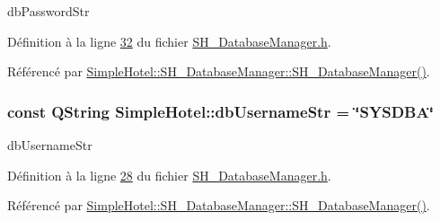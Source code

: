 db\-Password\-Str 



Définition à la ligne \hyperlink{SH__DatabaseManager_8h_source_l00032}{32} du fichier \hyperlink{SH__DatabaseManager_8h_source}{S\-H\-\_\-\-Database\-Manager.\-h}.



Référencé par \hyperlink{classSimpleHotel_1_1SH__DatabaseManager_ade00a085fdf7207d67476179e179d03d}{Simple\-Hotel\-::\-S\-H\-\_\-\-Database\-Manager\-::\-S\-H\-\_\-\-Database\-Manager()}.

\hypertarget{namespaceSimpleHotel_a4f58c043ac3cee459febaf503463b523}{
\subsubsection[{db\-Username\-Str}]{\setlength{\rightskip}{0pt plus 5cm}const Q\-String Simple\-Hotel\-::db\-Username\-Str = \char`\"{}S\-Y\-S\-D\-B\-A\char`\"{}\hspace{0.3cm}{\ttfamily [static]}}}\label{namespaceSimpleHotel_a4f58c043ac3cee459febaf503463b523}


db\-Username\-Str 



Définition à la ligne \hyperlink{SH__DatabaseManager_8h_source_l00028}{28} du fichier \hyperlink{SH__DatabaseManager_8h_source}{S\-H\-\_\-\-Database\-Manager.\-h}.



Référencé par \hyperlink{classSimpleHotel_1_1SH__DatabaseManager_ade00a085fdf7207d67476179e179d03d}{Simple\-Hotel\-::\-S\-H\-\_\-\-Database\-Manager\-::\-S\-H\-\_\-\-Database\-Manager()}.


